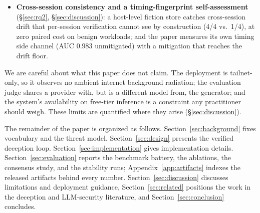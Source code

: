 \begin{itemize}
automated rubric against a hash-pinned \attck{} taxonomy, which caught a
realized scorer-validity failure (echo-crediting on fallback-heavy
serves) and motivated a correction that moves machine-vs-human agreement
from $\kappa=-0.187$ to $+0.349$; served-text and analysis metrics are
reported as declared, separate channels, with an external-baseline ladder
(vanilla Cowrie, stateful-LLM, bare-LLM, grounded-without-verifier, full
verified loop) on one workload.
\item \textbf{Cross-session consistency and a timing-fingerprint self-assessment}
(\S\ref{sec:rq2}, \S\ref{sec:discussion}): a host-level fiction store
catches cross-session drift that per-session verification cannot see by
construction (4/4 vs.\ 1/4), at zero paired cost on benign workloads; and
the paper measures its own timing side channel (AUC $0.983$ unmitigated)
with a mitigation that reaches the drift floor.
\end{itemize}

We are careful about what this paper does not claim. The deployment is
tailnet-only, so it observes no ambient internet background radiation; the
evaluation judge shares a provider with, but is a different model from, the
generator; and the system's availability on free-tier inference is a
constraint any practitioner should weigh. These limits are quantified
where they arise (\S\ref{sec:discussion}).

The remainder of the paper is organized as follows.
Section~\ref{sec:background} fixes vocabulary and the threat model.
Section~\ref{sec:design} presents the verified deception loop.
Section~\ref{sec:implementation} gives implementation details.
Section~\ref{sec:evaluation} reports the benchmark battery, the ablations,
the consensus study, and the stability runs; Appendix~\ref{app:artifacts}
indexes the released artifacts behind every number.
Section~\ref{sec:discussion} discusses limitations and deployment
guidance, Section~\ref{sec:related} positions the work in the deception
and LLM-security literature, and Section~\ref{sec:conclusion} concludes.

